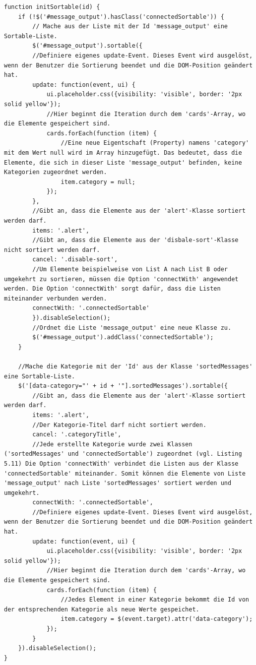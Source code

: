 \begin{lstlisting}[caption={Sortierfunktion auf der Präsentation-Seite - JavaScript}, label=lst:sortierfunktion, captionpos=b]
function initSortable(id) {
	if (!$('#message_output').hasClass('connectedSortable')) {
		// Mache aus der Liste mit der Id 'message_output' eine Sortable-Liste.
		$('#message_output').sortable({
		//Definiere eigenes update-Event. Dieses Event wird ausgelöst, wenn der Benutzer die Sortierung beendet und die DOM-Position geändert hat.
		update: function(event, ui) {
			ui.placeholder.css({visibility: 'visible', border: '2px solid yellow'});
			//Hier beginnt die Iteration durch dem 'cards'-Array, wo die Elemente gespeichert sind.
			cards.forEach(function (item) {
				//Eine neue Eigentschaft (Property) namens 'category' mit dem Wert null wird im Array hinzugefügt. Das bedeutet, dass die Elemente, die sich in dieser Liste 'message_output' befinden, keine Kategorien zugeordnet werden.
				item.category = null;
			});
		},
		//Gibt an, dass die Elemente aus der 'alert'-Klasse sortiert werden darf.
		items: '.alert',
		//Gibt an, dass die Elemente aus der 'disbale-sort'-Klasse nicht sortiert werden darf.
		cancel: '.disable-sort',
		//Um Elemente beispielweise von List A nach List B oder umgekehrt zu sortieren, müssen die Option 'connectWith' angewendet werden. Die Option 'connectWith' sorgt dafür, dass die Listen miteinander verbunden werden.
		connectWith: '.connectedSortable'
		}).disableSelection();
		//Ordnet die Liste 'message_output' eine neue Klasse zu.
		$('#message_output').addClass('connectedSortable');
	}
	
	//Mache die Kategorie mit der 'Id' aus der Klasse 'sortedMessages' eine Sortable-Liste.
	$('[data-category="' + id + '"].sortedMessages').sortable({
		//Gibt an, dass die Elemente aus der 'alert'-Klasse sortiert werden darf.
		items: '.alert',
		//Der Kategorie-Titel darf nicht sortiert werden.
		cancel: '.categoryTitle',
		//Jede erstellte Kategorie wurde zwei Klassen ('sortedMessages' und 'connectedSortable') zugeordnet (vgl. Listing  5.11) Die Option 'connectWith' verbindet die Listen aus der Klasse 'connectedSortable' miteinander. Somit können die Elemente von Liste 'message_output' nach Liste 'sortedMessages' sortiert werden und umgekehrt.
		connectWith: '.connectedSortable',
		//Definiere eigenes update-Event. Dieses Event wird ausgelöst, wenn der Benutzer die Sortierung beendet und die DOM-Position geändert hat.
		update: function(event, ui) {
			ui.placeholder.css({visibility: 'visible', border: '2px solid yellow'});
			//Hier beginnt die Iteration durch dem 'cards'-Array, wo die Elemente gespeichert sind.
			cards.forEach(function (item) {
				//Jedes Element in einer Kategorie bekommt die Id von der entsprechenden Kategorie als neue Werte gespeichet.
				item.category = $(event.target).attr('data-category');
			});
		}
	}).disableSelection();
}
\end{lstlisting}

